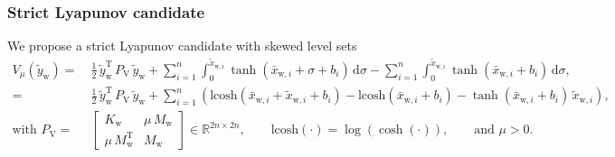 \subsubsection{Strict Lyapunov candidate}
We propose a strict Lyapunov candidate with skewed level sets~\citep{wu2022passive}
\begin{equation}\label{eq:con:conw_lyapunov_function}
\begin{split}
    V_\mu(\tilde{y}_\mathrm{w}) =& \: \frac{1}{2} \, \tilde{y}_\mathrm{w}^\mathrm{T} \, P_\mathrm{V} \, \tilde{y}_\mathrm{w} + \sum_{i=1}^n \int_{0}^{\tilde{x}_{\mathrm{w},i}} \tanh(\bar{x}_{\mathrm{w},i}+\sigma+b_i) \, \mathrm{d} \sigma - \sum_{i=1}^n \int_{0}^{\tilde{x}_{\mathrm{w},i}} \tanh(\bar{x}_{\mathrm{w},i}+b_i) \, \mathrm{d} \sigma,\\
    =& \: \frac{1}{2} \, \tilde{y}_\mathrm{w}^\mathrm{T} \, P_\mathrm{V} \, \tilde{y}_\mathrm{w} + \sum_{i=1}^n \left ( \mathrm{lcosh}(\bar{x}_{\mathrm{w},i} + \tilde{x}_{\mathrm{w},i}+b_i)-\mathrm{lcosh}(\bar{x}_{\mathrm{w},i}+b_i)-\tanh(\bar{x}_{\mathrm{w},i}+b_i) \, \tilde{x}_{\mathrm{w},i} \right ),\\
    \text{with } P_\mathrm{V} =& \: \begin{bmatrix}
        K_\mathrm{w} & \mu \, M_\mathrm{w}\\
        \mu \, M_\mathrm{w}^\mathrm{T} & M_\mathrm{w}
    \end{bmatrix} \in \mathbb{R}^{2n \times 2n}, \qquad \mathrm{lcosh}(\cdot) = \log(\cosh(\cdot)), \qquad \text{and } \mu > 0.
\end{split}
\end{equation}

